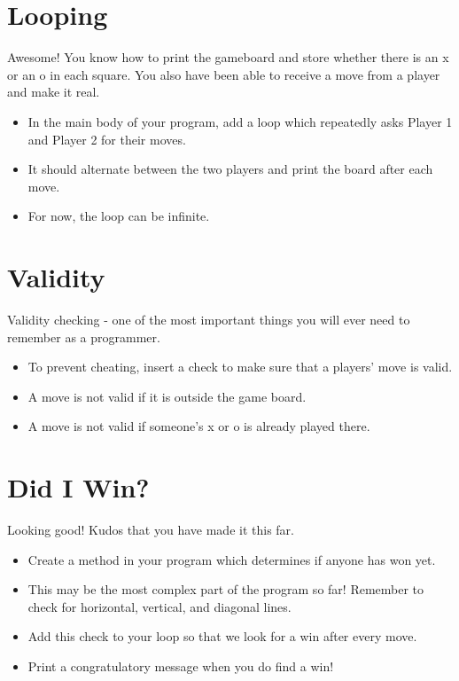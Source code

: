 \documentclass{42-en}
\begin{document}
\chapter{Looping}

Awesome! You know how to print the gameboard and store whether there is an x or an o in each square. You also have been able to receive a move from a player and make it real.

\begin{itemize}

	\item In the main body of your program, add a loop which repeatedly asks Player 1 and Player 2 for their moves.

	\item It should alternate between the two players and print the board after each move.

	\item For now, the loop can be infinite.

\end{itemize}

\chapter{Validity}

Validity checking - one of the most important things you will ever need to remember as a programmer.

\begin{itemize}

	\item To prevent cheating, insert a check to make sure that a players' move is valid.

	\item A move is not valid if it is outside the game board.

	\item A move is not valid if someone's x or o is already played there.

\end{itemize}

\chapter{Did I Win?}

Looking good! Kudos that you have made it this far. 

\begin{itemize}

	\item Create a method in your program which determines if anyone has won yet.

	\item This may be the most complex part of the program so far! Remember to check for horizontal, vertical, and diagonal lines.

	\item Add this check to your loop so that we look for a win after every move.

	\item Print a congratulatory message when you do find a win!

\end{itemize}
\end{document}
